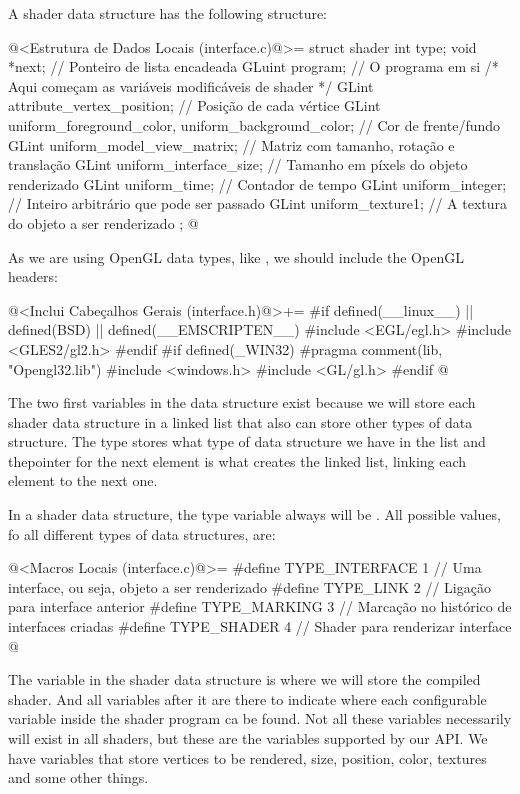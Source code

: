 A shader data structure has the following structure:

\iniciocodigo
@<Estrutura de Dados Locais (interface.c)@>=
struct shader {
  int type;
  void *next; // Ponteiro de lista encadeada
  GLuint program; // O programa em si
  /* Aqui começam as variáveis modificáveis de shader */
  GLint attribute_vertex_position; // Posição de cada vértice
  GLint uniform_foreground_color, uniform_background_color; // Cor de frente/fundo
  GLint uniform_model_view_matrix; // Matriz com tamanho, rotação e translação
  GLint uniform_interface_size; // Tamanho em píxels do objeto renderizado
  GLint uniform_time; // Contador de tempo
  GLint uniform_integer; // Inteiro arbitrário que pode ser passado
  GLint uniform_texture1; // A textura do objeto a ser renderizado
};
@
\fimcodigo

As we are using OpenGL data types, like , we should
include the OpenGL headers:

\iniciocodigo
@<Inclui Cabeçalhos Gerais (interface.h)@>+=
#if defined(__linux__) || defined(BSD) || defined(__EMSCRIPTEN__)
#include <EGL/egl.h>
#include <GLES2/gl2.h>
#endif
#if defined(_WIN32)
#pragma comment(lib, "Opengl32.lib")
#include <windows.h>
#include <GL/gl.h>
#endif
@
\fimcodigo

The two first variables in the data structure exist because we will
store each shader data structure in a linked list that also can store
other types of data structure. The type stores what type of data
structure we have in the list and thepointer for the next element is
what creates the linked list, linking each element to the next one.

In a shader data structure, the type variable always will
be . All possible values, fo all different
types of data structures, are:

\iniciocodigo
@<Macros Locais (interface.c)@>=
#define TYPE_INTERFACE 1 // Uma interface, ou seja, objeto a ser renderizado
#define TYPE_LINK      2 // Ligação para interface anterior
#define TYPE_MARKING   3 // Marcação no histórico de interfaces criadas
#define TYPE_SHADER    4 // Shader para renderizar interface
@
\fimcodigo

The variable  in the shader data structure is
where we will store the compiled shader. And all variables after it
are there to indicate where each configurable variable inside the
shader program ca be found. Not all these variables necessarily will
exist in all shaders, but these are the variables supported by our
API. We have variables that store vertices to be rendered, size,
position, color, textures and some other things.

